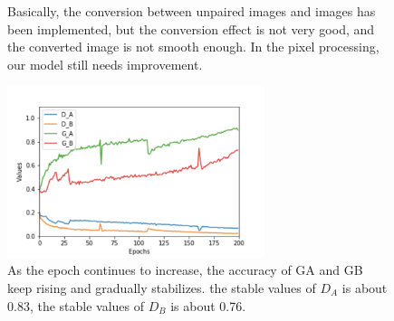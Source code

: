 \begin{figure}[thb]
\centering
{}
  \space \space \space \space \space \space \space
\caption{}
\label{fig:change2}
\centering
      \space \space \space \space \space \space \space
  \caption{Basically, the conversion between unpaired images and images has been implemented, but the conversion effect is not very good, and the converted image is not smooth enough. In the pixel processing, our model still needs improvement.}
  \label{fig:change}

      \includegraphics[width=0.67\textwidth]{images/loss200_02.pdf}
  \caption{As the epoch continues to increase,
  the accuracy of GA and GB 
  keep rising and gradually stabilizes.
  the stable values of $D_A$ is about 0.83,
  the stable values of $D_B$ is about 0.76.}
  \label{fig:loss200_02}
\end{figure}
